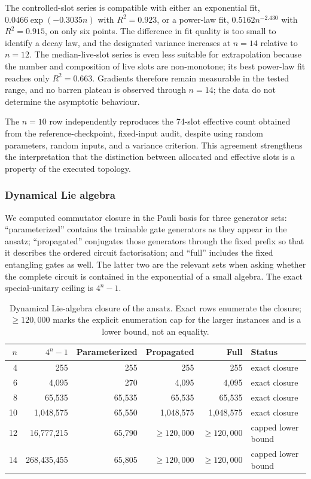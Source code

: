 \documentclass[conference]{IEEEtran}
\begin{document}
The controlled-slot series is compatible with either an exponential fit,
$0.0466\exp(-0.3035n)$ with $R^2=0.923$, or a power-law fit,
$0.5162n^{-2.430}$ with $R^2=0.915$, on only six points. The difference in
fit quality is too small to identify a decay law, and the designated variance
increases at $n=14$ relative to $n=12$. The median-live-slot series is even
less suitable for extrapolation because the number and composition of live
slots are non-monotone; its best power-law fit reaches only $R^2=0.663$. Gradients therefore remain measurable in the tested range, and no barren plateau is observed through $n=14$; the data do not determine the asymptotic behaviour.

The $n=10$ row independently reproduces the 74-slot effective count obtained
from the reference-checkpoint, fixed-input audit, despite using random parameters,
random inputs, and a variance criterion. This agreement strengthens the
interpretation that the distinction between allocated and effective slots is a
property of the executed topology. 

\subsubsection{Dynamical Lie algebra}
We computed commutator closure in the Pauli basis for three generator sets:
``parameterized'' contains the trainable gate generators as they appear in the
ansatz; ``propagated'' conjugates those generators through the fixed prefix so
that it describes the ordered circuit factorisation; and ``full'' includes the
fixed entangling gates as well. The latter two are the relevant sets when
asking whether the complete circuit is contained in the exponential of a
small algebra. The exact special-unitary ceiling is $4^n-1$.

\begin{table}[!t]
\caption{Dynamical Lie-algebra closure of the ansatz. Exact rows enumerate the closure; $\geq 120{,}000$ marks the explicit enumeration cap for the larger instances and is a lower bound, not an equality.}
\label{tab:dla}
\centering
\small
\begin{tabular}{@{}rrrrrl@{}}
\toprule
\textbf{$n$} & \textbf{$4^n-1$} & \textbf{Parameterized} & \textbf{Propagated} & \textbf{Full} & \textbf{Status} \\
\midrule
4 & 255 & 255 & 255 & 255 & exact closure \\
6 & 4,095 & 270 & 4,095 & 4,095 & exact closure \\
8 & 65,535 & 65,535 & 65,535 & 65,535 & exact closure \\
10 & 1,048,575 & 65,550 & 1,048,575 & 1,048,575 & exact closure \\
12 & 16,777,215 & 65,790 & $\geq120,000$ & $\geq120,000$ & capped lower bound \\
14 & 268,435,455 & 65,805 & $\geq120,000$ & $\geq120,000$ & capped lower bound \\
\bottomrule
\end{tabular}
\end{table}
\end{document}
